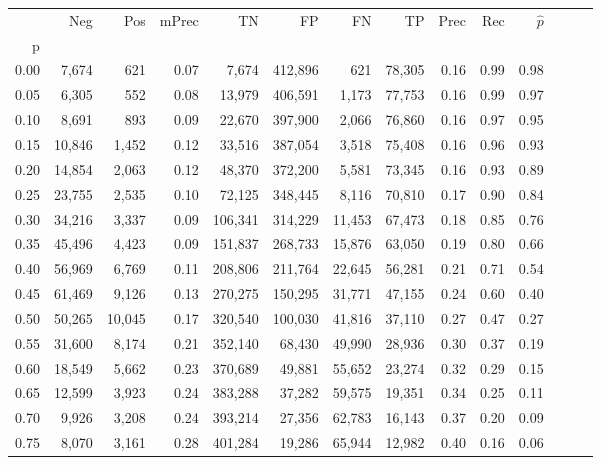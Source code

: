 \begin{tabular}{rrrrrrrrrrrrrr}
\toprule
{} &     Neg &     Pos & mPrec &       TN &       FP &      FN &      TP &  Prec &   Rec & $\hat{p}$ \\
p    &         &         &       &          &          &         &         &       &       &           \\
\midrule
0.00 &   7,674 &     621 &  0.07 &    7,674 &  412,896 &     621 &  78,305 &  0.16 &  0.99 &      0.98 \\
0.05 &   6,305 &     552 &  0.08 &   13,979 &  406,591 &   1,173 &  77,753 &  0.16 &  0.99 &      0.97 \\
0.10 &   8,691 &     893 &  0.09 &   22,670 &  397,900 &   2,066 &  76,860 &  0.16 &  0.97 &      0.95 \\
0.15 &  10,846 &   1,452 &  0.12 &   33,516 &  387,054 &   3,518 &  75,408 &  0.16 &  0.96 &      0.93 \\
0.20 &  14,854 &   2,063 &  0.12 &   48,370 &  372,200 &   5,581 &  73,345 &  0.16 &  0.93 &      0.89 \\
0.25 &  23,755 &   2,535 &  0.10 &   72,125 &  348,445 &   8,116 &  70,810 &  0.17 &  0.90 &      0.84 \\
0.30 &  34,216 &   3,337 &  0.09 &  106,341 &  314,229 &  11,453 &  67,473 &  0.18 &  0.85 &      0.76 \\
0.35 &  45,496 &   4,423 &  0.09 &  151,837 &  268,733 &  15,876 &  63,050 &  0.19 &  0.80 &      0.66 \\
0.40 &  56,969 &   6,769 &  0.11 &  208,806 &  211,764 &  22,645 &  56,281 &  0.21 &  0.71 &      0.54 \\
0.45 &  61,469 &   9,126 &  0.13 &  270,275 &  150,295 &  31,771 &  47,155 &  0.24 &  0.60 &      0.40 \\
0.50 &  50,265 &  10,045 &  0.17 &  320,540 &  100,030 &  41,816 &  37,110 &  0.27 &  0.47 &      0.27 \\
0.55 &  31,600 &   8,174 &  0.21 &  352,140 &   68,430 &  49,990 &  28,936 &  0.30 &  0.37 &      0.19 \\
0.60 &  18,549 &   5,662 &  0.23 &  370,689 &   49,881 &  55,652 &  23,274 &  0.32 &  0.29 &      0.15 \\
0.65 &  12,599 &   3,923 &  0.24 &  383,288 &   37,282 &  59,575 &  19,351 &  0.34 &  0.25 &      0.11 \\
0.70 &   9,926 &   3,208 &  0.24 &  393,214 &   27,356 &  62,783 &  16,143 &  0.37 &  0.20 &      0.09 \\
0.75 &   8,070 &   3,161 &  0.28 &  401,284 &   19,286 &  65,944 &  12,982 &  0.40 &  0.16 &      0.06 \\

\end{tabular}
